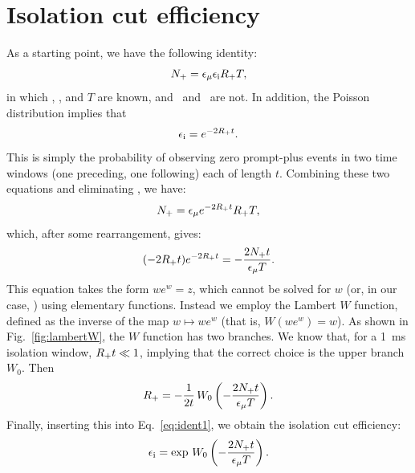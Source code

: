 \documentclass[../thesis.tex]{subfiles}
\begin{document}

\section{Isolation cut efficiency}
\label{sec:isolcuteff}

As a starting point, we have the following identity:
\begin{equation}
  \label{eq:ident0}
  N_\mathrm{+} = \epsilon_\mathrm{\mu} \epsilon_\mathrm{i} R_\mathrm{+} T,
\end{equation}
in which \Nplu, \emu, and $T$ are known, and \eisol\ and \Rplu\ are not. In addition, the Poisson distribution implies that
\begin{equation}
  \label{eq:ident1}
  \epsilon_\mathrm{i} = e^{-2R_\mathrm{+} t}.
\end{equation}
This is simply the probability of observing zero prompt-plus events in two time windows (one preceding, one following) each of length $t$. Combining these two equations and eliminating \eisol, we have:
\begin{equation}
  N_\mathrm{+} = \epsilon_\mathrm{\mu} e^{-2R_\mathrm{+} t} R_\mathrm{+} T,
\end{equation}
which, after some rearrangement, gives:
\begin{equation}
  (-2 R_\mathrm{+} t) e^{-2 R_\mathrm{+} t} = - \frac{2 N_\mathrm{+} t}{\epsilon_\mathrm{\mu} T}.
\end{equation}
This equation takes the form $we^w = z$, which cannot be solved for $w$ (or, in our case, \Rplu) using elementary functions. Instead we employ the Lambert $W$ function, defined as the inverse of the map $w \mapsto we^w$ (that is, $W(we^w) = w$). As shown in Fig.~\ref{fig:lambertW}, the $W$ function has two branches. We know that, for a 1~ms isolation window, $R_\mathrm{+} t \ll 1$, implying that the correct choice is the upper branch $W_0$. Then
\begin{equation}
  R_\mathrm{+} = -\frac{1}{2t}\, W_0 \left(-\frac{2N_\mathrm{+} t}{\epsilon_\mathrm{\mu} T}\right).
\end{equation}
Finally, inserting this into Eq.~\ref{eq:ident1}, we obtain the isolation cut efficiency:
\begin{equation}
  \epsilon_\mathrm{i} = \exp \, W_0 \left( -\frac{2N_\mathrm{+} t}{\epsilon_\mathrm{\mu} T} \right).
\end{equation}
\end{document}
